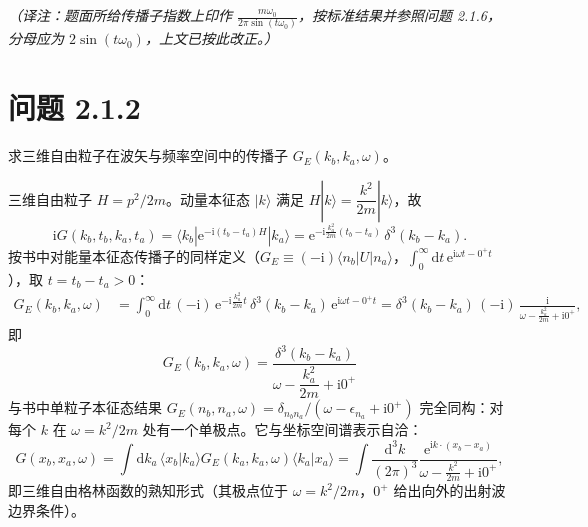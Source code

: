 \emph{（译注：题面所给传播子指数上印作 $\frac{m\omega_0}{2\pi\sin(t\omega_0)}$，按标准结果并参照问题 2.1.6，分母应为 $2\sin(t\omega_0)$，上文已按此改正。）}

\section*{问题 2.1.2}
\begin{problem}
求三维自由粒子在波矢与频率空间中的传播子 $G_E(k_b,k_a,\omega)$。
\end{problem}
\solution
三维自由粒子 $H=p^2/2m$。动量本征态 $|k\rangle$ 满足 $H|k\rangle=\dfrac{k^2}{2m}|k\rangle$，故
\begin{equation*}
\mathrm{i}G(k_b,t_b,k_a,t_a)=\langle k_b|\mathrm{e}^{-\mathrm{i}(t_b-t_a)H}|k_a\rangle
=\mathrm{e}^{-\mathrm{i}\frac{k_a^2}{2m}(t_b-t_a)}\,\delta^3(k_b-k_a).
\end{equation*}
按书中对能量本征态传播子的同样定义（$G_E\equiv(-\mathrm{i})\langle n_b|U|n_a\rangle$，$\int_0^\infty\mathrm{d}t\,\mathrm{e}^{\mathrm{i}\omega t-0^+t}$），取 $t=t_b-t_a>0$：
\begin{align*}
G_E(k_b,k_a,\omega)&=\int_0^{\infty}\mathrm{d}t\,(-\mathrm{i})\,\mathrm{e}^{-\mathrm{i}\frac{k_a^2}{2m}t}\,\delta^3(k_b-k_a)\,\mathrm{e}^{\mathrm{i}\omega t-0^+t}
=\delta^3(k_b-k_a)\,(-\mathrm{i})\,\frac{\mathrm{i}}{\omega-\frac{k_a^2}{2m}+\mathrm{i}0^+},
\end{align*}
即
\begin{equation*}
\boxed{\;G_E(k_b,k_a,\omega)=\frac{\delta^3(k_b-k_a)}{\omega-\dfrac{k_a^2}{2m}+\mathrm{i}0^+}\;}
\end{equation*}
与书中单粒子本征态结果 $G_E(n_b,n_a,\omega)=\delta_{n_bn_a}/(\omega-\epsilon_{n_a}+\mathrm{i}0^+)$ 完全同构：对每个 $k$ 在 $\omega=k^2/2m$ 处有一个单极点。它与坐标空间谱表示自洽：
\begin{equation*}
G(x_b,x_a,\omega)=\int\mathrm{d}k_a\,\langle x_b|k_a\rangle G_E(k_a,k_a,\omega)\langle k_a|x_a\rangle
=\int\frac{\mathrm{d}^3k}{(2\pi)^3}\frac{\mathrm{e}^{\mathrm{i}k\cdot(x_b-x_a)}}{\omega-\frac{k^2}{2m}+\mathrm{i}0^+},
\end{equation*}
即三维自由格林函数的熟知形式（其极点位于 $\omega=k^2/2m$，$0^+$ 给出向外的出射波边界条件）。

